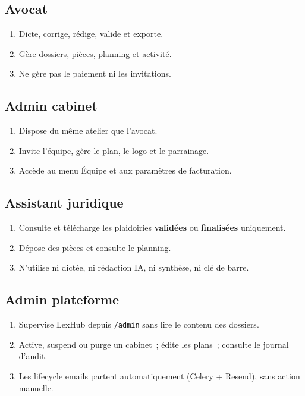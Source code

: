 \subsection{Avocat}
\begin{enumerate}[leftmargin=*,label=\arabic*.]
  \item Dicte, corrige, rédige, valide et exporte.
  \item Gère dossiers, pièces, planning et activité.
  \item Ne gère pas le paiement ni les invitations.
\end{enumerate}

\subsection{Admin cabinet}
\begin{enumerate}[leftmargin=*,label=\arabic*.]
  \item Dispose du même atelier que l'avocat.
  \item Invite l'équipe, gère le plan, le logo et le parrainage.
  \item Accède au menu Équipe et aux paramètres de facturation.
\end{enumerate}

\subsection{Assistant juridique}
\begin{enumerate}[leftmargin=*,label=\arabic*.]
  \item Consulte et télécharge les plaidoiries \textbf{validées} ou \textbf{finalisées} uniquement.
  \item Dépose des pièces et consulte le planning.
  \item N'utilise ni dictée, ni rédaction IA, ni synthèse, ni clé de barre.
\end{enumerate}

\subsection{Admin plateforme}
\begin{enumerate}[leftmargin=*,label=\arabic*.]
  \item Supervise LexHub depuis \texttt{/admin} sans lire le contenu des dossiers.
  \item Active, suspend ou purge un cabinet~; édite les plans~; consulte le journal d'audit.
  \item Les lifecycle emails partent automatiquement (Celery + Resend), sans action manuelle.
\end{enumerate}

